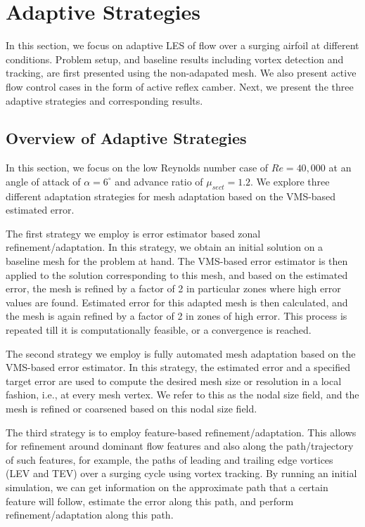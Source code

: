 \chapter{Adaptive Strategies}

In this section, we focus on adaptive LES of flow over a surging airfoil at different conditions. Problem setup, and baseline results including vortex detection and tracking, are first presented using the non-adapated mesh. We also present active flow control cases in the form of active reflex camber. Next, we present the three adaptive strategies and corresponding results. 


\label{sec:baseline_results}

\section{Overview of Adaptive Strategies}

In this section, we focus on the low Reynolds number case of $Re=40,000$ at an angle of attack of $\alpha=6^\circ$ and advance ratio of $\mu_{sect}=1.2$. We explore three different adaptation strategies for mesh adaptation based on the VMS-based estimated error. 

The first strategy we employ is error estimator based zonal refinement/adaptation. 
In this strategy, we obtain an initial solution on a baseline mesh for the problem at hand. The VMS-based error estimator is then applied to the solution corresponding to this mesh, and based on the estimated error, the mesh is refined by a factor of 2 in particular zones where high error values are found. Estimated error for this adapted mesh is then calculated, and the mesh is again refined by a factor of 2 in zones of high error. This process is repeated till it is computationally feasible, or a convergence is reached.

The second strategy we employ is fully automated mesh adaptation based on the VMS-based error estimator. In this strategy, the estimated error and a specified target error are used to compute the desired mesh size or resolution in a local fashion, i.e., at every mesh vertex. We refer to this as the nodal size field, and the mesh is refined or coarsened based on this nodal size field. 

The third strategy is to employ feature-based refinement/adaptation. This allows for refinement around dominant flow features and also along the path/trajectory of such features, for example, the paths of leading and trailing edge vortices (LEV and TEV) over a surging cycle using vortex tracking. By running an initial simulation, we can get information on the approximate path that a certain feature will follow, estimate the error along this path, and perform refinement/adaptation along this path. 

